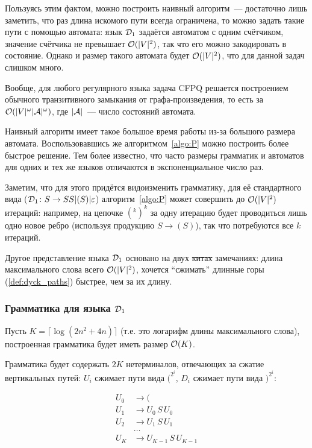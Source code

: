 \begin{note}
  Пользуясь этим фактом, можно построить наивный алгоритм~--- достаточно лишь заметить, что раз длина искомого пути всегда ограничена, то можно задать такие пути с помощью автомата: язык $\mathcal{D}_1$ задаётся автоматом с одним счётчиком, значение счётчика не превышает $\mathcal{O}(|V|^2)$, так что его можно закодировать в состояние. Однако и размер такого автомата будет $\mathcal{O}(|V|^2)$, что для данной задач слишком много.
\end{note} 

\begin{note}\label{fact:regular_cfpq}
  Вообще, для любого регулярного языка задача CFPQ решается построением обычного транзитивного замыкания от графа-произведения, то есть за $\mathcal{O}(|V|^{\omega} |\mathcal{A}|^{\omega})$, где $|\mathcal{A}|$~--- число состояний автомата.
\end{note}

Наивный алгоритм имеет такое большое время работы из-за большого размера автомата. Воспользовавшись же алгоритмом~\ref{algo:P} можно построить более быстрое решение. Тем более известно, что часто размеры грамматик и автоматов для одних и тех же языков отличаются в экспоненциальное число раз.

Заметим, что для этого придётся видоизменить грамматику, для её стандартного вида ($\mathcal{D}_1 \colon S \rightarrow SS | ( S ) | \varepsilon$) алгоритм~\ref{algo:P} может совершить до $\mathcal{O}(|V|^2)$ итераций: например, на цепочке $(^k )^k$ за одну итерацию будет проводиться лишь одно новое ребро (используя продукцию $S \to ( S )$), так что потребуются все $k$ итераций.

Другое представление языка $\mathcal{D}_1$ основано на двух \sout{китах} замечаниях: длина максимального слова всего $\mathcal{O}(|V|^2)$, хочется ``сжимать'' длинные горы (\ref{def:dyck_paths}) быстрее, чем за их длину.

\subsubsection{Грамматика для языка $\mathcal{D}_1$}

Пусть $K = \lceil \log (2 n^2 + 4n) \rceil$ (т.е. это логарифм длины максимального слова), построенная грамматика будет иметь размер $\mathcal{O}(K)$.

Грамматика будет содержать $2K$ нетерминалов, отвечающих за сжатие вертикальных путей: $U_i$ сжимает пути вида $(^{2^i}$, $D_i$ сжимает пути вида $)^{2^i}$:

\begin{align*}\label{eq:U}
  U_0 &\to ( \\
  U_1 &\to U_0\, S\, U_0 \\
  U_2 &\to U_1\, S\, U_1 \\
  &\dots \\
  U_K &\to U_{K-1}\, S\, U_{K-1} 
\end{align*}

